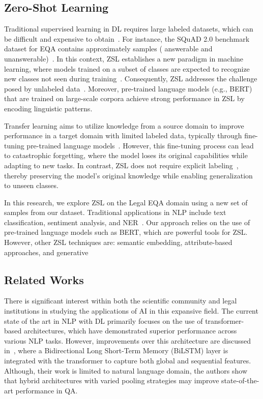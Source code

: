 \documentclass[runningheads]{llncs}
\begin{document}
\subsection{Zero-Shot Learning}
\label{sec:zero-shot-learning}

Traditional supervised learning in \ac{DL} requires large labeled
datasets, which can be difficult and expensive to
obtain~\cite{Rampur2018}. For instance, the \ac{SQuAD} 2.0 benchmark
dataset for \ac{EQA} contains approximately  samples
( answerable and 
unanswerable)~\cite{rajpurkar2018}. In this context, \ac{ZSL}
establishes a new paradigm in machine learning, where models trained
on a subset of classes are expected to recognize new classes not seen
during training~\cite{Ramesh2025}. Consequently, \ac{ZSL} addresses
the challenge posed by unlabeled data~\cite{Rampur2018}. Moreover,
pre-trained language models (e.g., BERT) that are trained on
large-scale corpora achieve strong performance in \ac{ZSL} by encoding
linguistic patterns.

Transfer learning aims to utilize knowledge from a source domain to
improve performance in a target domain with limited labeled data,
typically through fine-tuning pre-trained language
models~\cite{Ramesh2025}. However, this fine-tuning process can lead
to catastrophic forgetting, where the model loses its original
capabilities while adapting to new tasks. In contrast, \ac{ZSL} does
not require explicit labeling~\cite{YuchenGuo2018}, thereby preserving the
model's original knowledge while enabling generalization to unseen
classes.

In this research, we explore \ac{ZSL} on the Legal \ac{EQA}
domain using a new set of samples from our dataset. Traditional
applications in \ac{NLP} include text classification, sentiment
analysis, and \ac{NER}~\cite{Rampur2018}. Our approach relies on the
use of pre-trained language models such as BERT, which are powerful
tools for \ac{ZSL}. However, other \ac{ZSL} techniques are: semantic
embedding, attribute-based approaches, and
generative~\cite{Ramesh2025,Rampur2018}


\subsection{Related Works}
\label{sec:related-works}

There is significant interest within both the scientific community and
legal institutions in studying the applications of \ac{AI} in this
expansive field. The current state of the art in \ac{NLP} with DL
primarily focuses on the use of transformer-based architectures, which
have demonstrated superior performance across various \ac{NLP}
tasks. However, improvements over this architecture are discussed
in~\cite{Shao_Guo_Chen_Zepeng_2019}, where a Bidirectional Long
Short-Term Memory (BiLSTM) layer is integrated with the transformer to
capture both global and sequential features. Although, their work is
limited to natural language domain, the authors show that hybrid
architectures with varied pooling strategies may improve
state-of-the-art performance in \ac{QA}.
\end{document}
